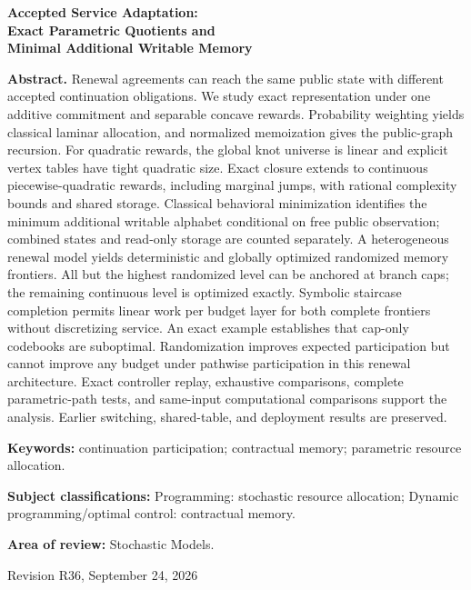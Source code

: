 \documentclass[11pt,letterpaper]{article}
\theoremstyle{definition}\newtheorem{assumption}[theorem]{Assumption}
\begin{document}
\hypersetup{pageanchor=false}
\begin{titlepage}\centering
{\Large\bfseries Accepted Service Adaptation:\\ Exact Parametric Quotients and\\ Minimal Additional Writable Memory\par}
\vspace{.35in}{Anonymous manuscript for Operations Research\par}\vspace{.25in}
\begin{minipage}{\textwidth}
\textbf{Abstract.} Renewal agreements can reach the same public state with different accepted continuation obligations. We study exact representation under one additive commitment and separable concave rewards. Probability weighting yields classical laminar allocation, and normalized memoization gives the public-graph recursion. For quadratic rewards, the global knot universe is linear and explicit vertex tables have tight quadratic size. Exact closure extends to continuous piecewise-quadratic rewards, including marginal jumps, with rational complexity bounds and shared storage. Classical behavioral minimization identifies the minimum additional writable alphabet conditional on free public observation; combined states and read-only storage are counted separately. A heterogeneous renewal model yields deterministic and globally optimized randomized memory frontiers. All but the highest randomized level can be anchored at branch caps; the remaining continuous level is optimized exactly. Symbolic staircase completion permits linear work per budget layer for both complete frontiers without discretizing service. An exact example establishes that cap-only codebooks are suboptimal. Randomization improves expected participation but cannot improve any budget under pathwise participation in this renewal architecture. Exact controller replay, exhaustive comparisons, complete parametric-path tests, and same-input computational comparisons support the analysis. Earlier switching, shared-table, and deployment results are preserved.
\par\vspace{.15in}\textbf{Keywords:} continuation participation; contractual memory; parametric resource allocation.
\par\vspace{.1in}\textbf{Subject classifications:} Programming: stochastic resource allocation; Dynamic programming/optimal control: contractual memory.
\par\vspace{.1in}\textbf{Area of review:} Stochastic Models.
\end{minipage}\vfill{Revision R36, September 24, 2026\par}
\end{titlepage}
\end{document}
